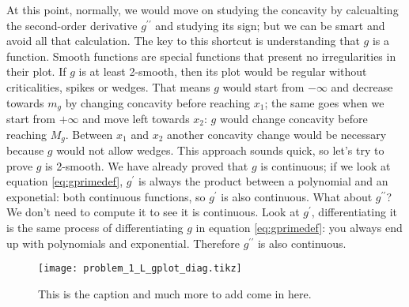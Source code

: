 At this point, normally, we would move on studying
the concavity by calcualting the second-order
derivative $g^{\prime\prime}$ and studying its sign;
but we can be smart and avoid all that calculation.
The key to this shortcut is understanding that $g$ is a
 function. Smooth functions are special functions that present
no irregularities in their plot. If $g$ is at least 2-smooth, then its plot would be regular without
criticalities, spikes or wedges.
That means $g$ would start from $-\infty$ and decrease towards $m_g$ by changing
concavity before reaching $x_1$; the same goes when we start from $+\infty$ and move left towards $x_2$:
$g$ would change concavity before reaching $M_g$. Between $x_1$ and $x_2$ another concavity change would be
necessary because $g$ would not allow wedges. This approach sounds quick, so let's try to
prove $g$ is 2-smooth. We have already proved that $g$ is continuous; if we look at
equation \ref{eq:gprimedef}, $g^\prime$ is always the product between a polynomial and an exponetial:
both continuous functions, so $g^\prime$ is also continuous.
What about $g^{\prime\prime}$? We don't need to compute it to see it is continuous.
Look at $g^\prime$, differentiating it is the same process of
differentiating $g$ in equation \ref{eq:gprimedef}: you always end up with polynomials and exponential.
Therefore $g^{\prime\prime}$ is also
continuous.

\begin{figure*}[h] %
    \texttt{[image: problem\_1\_L\_gplot\_diag.tikz]}
    \caption{This is the caption and much more to add come in here.}%
    \label{fig:fplot}%
\end{figure*}

